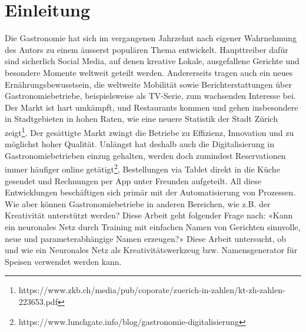 \chapter{Einleitung}
\label{ch:introduction}

Die Gastronomie hat sich im vergangenen Jahrzehnt nach eigener Wahrnehmung des Autors zu einem äusserst populären Thema entwickelt.
Haupttreiber dafür sind sicherlich Social Media, auf denen kreative Lokale, ausgefallene Gerichte und besondere Momente weltweit geteilt werden.
Andererseits tragen auch ein neues Ernährungsbewusstsein, die weltweite Mobilität sowie Berichterstattungen über Gastronomiebetriebe, beispielsweise als TV-Serie, zum wachsenden Interesse bei.
Der Markt ist hart umkämpft, und Restaurants kommen und gehen insbesondere in Stadtgebieten in hohen Raten, wie eine neuere Statistik der Stadt Zürich zeigt\footnote{https://www.zkb.ch/media/pub/coporate/zuerich-in-zahlen/kt-zh-zahlen-223653.pdf}.
Der gesättigte Markt zwingt die Betriebe zu Effizienz, Innovation und zu möglichst hoher Qualität.
Unlängst hat deshalb auch die Digitalisierung in Gastronomiebetrieben einzug gehalten, werden doch zumindest Reservationen immer häufiger online getätigt\footnote{https://www.lunchgate.info/blog/gastronomie-digitalisierung}, Bestellungen via Tablet
direkt in die Küche gesendet und Rechnungen per App unter Freunden aufgeteilt.
All diese Entwicklungen beschäftigen sich primär mit der Automatisierung von Prozessen.
Wie aber können Gastronomiebetriebe in anderen Bereichen, wie z.B. der Kreativität unterstützt werden?
Diese Arbeit geht folgender Frage nach: «Kann ein neuronales Netz durch Training mit einfachen Namen von Gerichten sinnvolle, neue und parameterabhängige Namen erzeugen?»
Diese Arbeit untersucht, ob und wie ein Neuronales Netz als Kreativitätswerkzeug bzw. Namensgenerator für Speisen verwendet werden kann.
